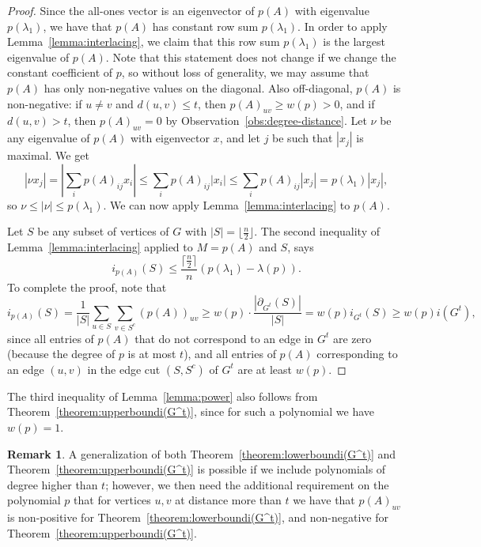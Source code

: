 \documentclass[a4paper,11pt]{article}
\theoremstyle{definition}
\newtheorem{remark}[theorem]{Remark}
\begin{document}
\begin{proof}
    Since the all-ones vector is an eigenvector of $p(A)$ with eigenvalue $p(\lambda_1)$, we have that $p(A)$ has constant row sum $p(\lambda_1)$. In order to apply Lemma~\ref{lemma:interlacing}, we claim that this row sum $p(\lambda_1)$ is the largest eigenvalue of $p(A)$. Note that this statement does not change if we change the constant coefficient of $p$, so without loss of generality, we may assume that $p(A)$ has only non-negative values on the diagonal. Also off-diagonal, $p(A)$ is non-negative: if $u\ne v$ and $d(u,v) \le t$, then $p(A)_{uv} \ge w(p)>0$, and if $d(u,v) >t$, then $p(A)_{uv} =0$ by Observation~\ref{obs:degree-distance}. Let $\nu$ be any eigenvalue of $p(A)$ with eigenvector $x$, and let $j$ be such that $|x_j|$ is maximal. We get
    $$| \nu x_j|=\left | \sum_{i} p(A)_{ij} x_i \right |\le \sum_{i} p(A)_{ij} |x_i|\le \sum_{i} p(A)_{ij}|x_j|=p(\lambda_1) |x_j|,$$
    so $\nu \le |\nu|\le p(\lambda_1)$. We can now apply Lemma~\ref{lemma:interlacing} to $p(A)$.

    Let $S$ be any subset of vertices of $G$ with $|S|=\lfloor \frac n2 \rfloor$. The second inequality of Lemma~\ref{lemma:interlacing} applied to $M=p(A)$ and $S$, says
    $$i_{p(A)}(S) \le \frac {\lceil \frac n2 \rceil}n (p(\lambda_1)-\lambda(p)).$$
    To complete the proof, note that
    $$i_{p(A)}(S)=\frac 1 {|S|}\sum_{u\in S} \sum_{v\in S^c} (p(A))_{uv} \ge w(p)\cdot \frac{|\partial_{G^t}(S)|}{|S|}= w(p)i_{G^t}(S)\ge w(p) i(G^t),$$
    since all entries of $p(A)$ that do not correspond to an edge in $G^t$ are zero (because the degree of $p$ is at most $t$), and all entries of $p(A)$ corresponding to an edge $(u,v)$ in the edge cut $(S,S^c)$ of $G^t$ are at least $w(p)$.
\end{proof}

The third inequality of Lemma~\ref{lemma:power} also follows from Theorem~\ref{theorem:upperboundi(G^t)}, since for such a polynomial we have $w(p)=1$.


\begin{remark}
A generalization of both Theorem~\ref{theorem:lowerboundi(G^t)} and Theorem~\ref{theorem:upperboundi(G^t)} is possible if we include polynomials of degree higher than $t$; however, we then need the additional requirement on the polynomial $p$ that for vertices $u,v$ at distance more than $t$ we have that $p(A)_{uv}$ is non-positive for Theorem~\ref{theorem:lowerboundi(G^t)}, and non-negative for Theorem~\ref{theorem:upperboundi(G^t)}. 
\end{remark}
\end{document}
